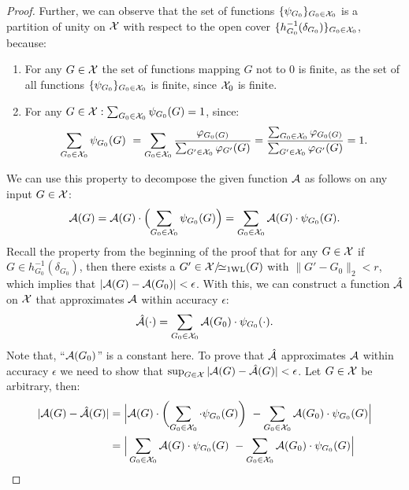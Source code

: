 \begin{proof}
    Further, we can observe that the set of functions $\{ \psi_{G_0}\}_{G_0 \in \mathcal{X}_0}$ is a partition of unity on $\mathcal{X}$ with respect to the open cover $\{ h_{G_0}^{-1}(\delta_{G_0}) \}_{G_0 \in \mathcal{X}_0}$, because:
    \begin{enumerate}
        \item For any $G \in \mathcal{X}$ the set of functions mapping $G$ not to $0$ is finite, as the set of all functions $\{ \psi_{G_0}\}_{G_0 \in \mathcal{X}_0}$ is finite, since $\mathcal{X}_0$ is finite.
        \item For any $G \in \mathcal{X}: \sum_{G_0 \in \mathcal{X}_0} \psi_{G_0}(G) = 1$, since: \begin{align*}
            \sum_{G_0 \in \mathcal{X}_0} \psi_{G_0}(G) \ = \sum_{G_0 \in \mathcal{X}_0} \frac{\varphi_{G_0(G)}}{\sum_{G' \in \mathcal{X}_0} \varphi_{G'}(G)} = \frac{\sum_{G_0 \in \mathcal{X}_0} \varphi_{G_0(G)}}{\sum_{G' \in \mathcal{X}_0} \varphi_{G'}(G)}= 1.
        \end{align*}
    \end{enumerate}
    We can use this property to decompose the given function $\mathcal{A}$ as follows on any input $G \in \mathcal{X}$:
    \begin{equation*}
        \mathcal{A}(G) = \mathcal{A}(G) \cdot \Bigl( \sum_{G_0 \in \mathcal{X}_0} \psi_{G_0}(G) \Bigr) = \sum_{G_0 \in \mathcal{X}_0} \mathcal{A}(G) \cdot \psi_{G_0}(G).
    \end{equation*}
    Recall the property from the beginning of the proof that for any $G \in \mathcal{X}$ if $G \in h_{G_0}^{-1}(\delta_{G_0})$, then there exists a $G' \in \mathcal{X}/\!{\simeq_{\text{1WL}}}(G)$ with $\| G' - G_0 \|_2 < r$, which implies that $|\mathcal{A}(G) - \mathcal{A}(G_0)| < \epsilon$. With this, we can construct a function $\hat{\mathcal{A}}$ on $\mathcal{X}$ that approximates $\mathcal{A}$ within accuracy $\epsilon$:
    \begin{equation*}
        \hat{\mathcal{A}}(\cdot) = \sum_{G_0 \in \mathcal{X}_0} \mathcal{A}(G_0) \cdot \psi_{G_0}(\cdot).
    \end{equation*}
    Note that, ``$\mathcal{A}(G_0)$'' is a constant here.
    To prove that $\hat{\mathcal{A}}$ approximates $\mathcal{A}$ within accuracy $\epsilon$ we need to show that $\sup_{G \in \mathcal{X}} |\mathcal{A}(G) - \hat{\mathcal{A}}(G) | < \epsilon$. Let $G \in \mathcal{X}$ be arbitrary, then:
    \begin{align}
        |\cA(G) - \hat{\cA}(G) | &= \Big|\cA(G) \cdot \biggl( \sum_{G_0 \in \cX_0}  \cdot \psi_{G_0}(G) \biggr) \ - \sum_{G_0 \in \cX_0} \cA(G_0) \cdot \psi_{G_0}(G)\Big|\nonumber\\
        &= \Big|\sum_{G_0 \in \cX_0} \cA(G) \cdot \psi_{G_0}(G) \ - \sum_{G_0 \in \cX_0} \cA(G_0) \cdot \psi_{G_0}(G)\Big|\nonumber\\

\end{align}
\end{proof}
